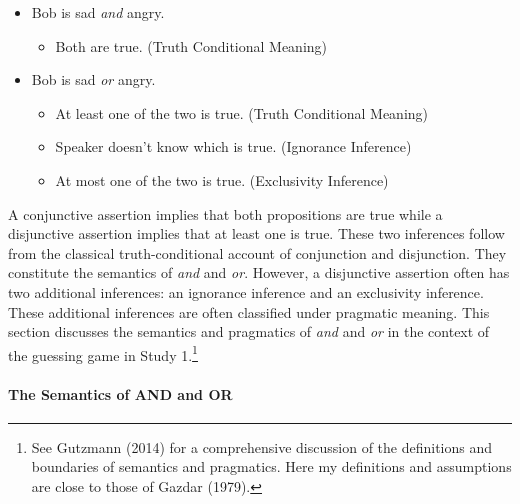 \documentclass[floatsintext,man]{apa6}
\providecommand{\tightlist}{%
  \setlength{\itemsep}{0pt}\setlength{\parskip}{0pt}}
\theoremstyle{definition}
\theoremstyle{definition}
\theoremstyle{definition}
\theoremstyle{remark}
\begin{document}
\begin{itemize}
\tightlist
\item
  Bob is sad \emph{and} angry.

  \begin{itemize}
  \tightlist
  \item
    Both are true. (Truth Conditional Meaning)
  \end{itemize}
\item
  Bob is sad \emph{or} angry.

  \begin{itemize}
  \tightlist
  \item
    At least one of the two is true. (Truth Conditional Meaning)
  \item
    Speaker doesn't know which is true. (Ignorance Inference)
  \item
    At most one of the two is true. (Exclusivity Inference)
  \end{itemize}
\end{itemize}

A conjunctive assertion implies that both propositions are true while a
disjunctive assertion implies that at least one is true. These two
inferences follow from the classical truth-conditional account of
conjunction and disjunction. They constitute the semantics of \emph{and}
and \emph{or}. However, a disjunctive assertion often has two additional
inferences: an ignorance inference and an exclusivity inference. These
additional inferences are often classified under pragmatic meaning. This
section discusses the semantics and pragmatics of \emph{and} and
\emph{or} in the context of the guessing game in Study 1.\footnote{See
  Gutzmann (2014) for a comprehensive discussion of the definitions and
  boundaries of semantics and pragmatics. Here my definitions and
  assumptions are close to those of Gazdar (1979).}

\paragraph{The Semantics of AND and
OR}\label{the-semantics-of-and-and-or}
\end{document}
